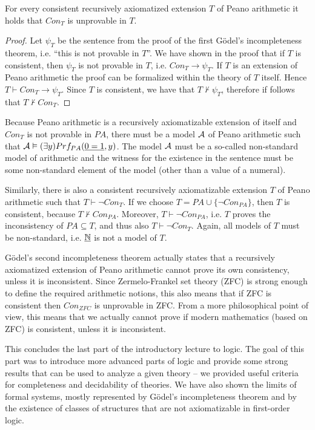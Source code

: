 \begin{theorem}
For every consistent recursively axiomatized extension $T$ of Peano arithmetic it holds that $Con_T$ is unprovable in $T$.
\end{theorem}
\begin{proof}
Let $\psi_T$ be the sentence from the proof of the first Gödel's incompleteness theorem, i.e. ``this is not provable in $T$''. We have shown in the proof that if $T$ is consistent, then $\psi_T$ is not provable in $T$, i.e. $Con_T \to \psi_T$. If $T$ is an extension of Peano arithmetic the proof can be formalized within the theory of $T$ itself. Hence $T\vdash Con_T \to \psi_T$. Since $T$ is consistent, we have that $T\nvdash \psi_T$, therefore if follows that $T \nvdash Con_T$. 
\end{proof}

Because Peano arithmetic is a recursively axiomatizable extension of itself and $Con_T$ is not provable in $PA$, there must be a model $\mathcal{A}$ of Peano arithmetic such that $\mathcal{A} \vDash (\exists y)Prf_{PA}(\underline{0 = 1}, y)$. The model $\mathcal{A}$ must be a so-called non-standard model of arithmetic and the witness for the existence in the sentence must be some non-standard element of the model (other than a value of a numeral).

Similarly, there is also a consistent recursively axiomatizable extension $T$ of Peano arithmetic such that $T \vdash \neg Con_T$. If we choose $T = PA \cup \{\neg Con_{PA}\}$, then $T$ is consistent, because $T \nvdash Con_{PA}$. Moreover, $T \vdash \neg Con_{PA}$, i.e. $T$ proves the inconsistency of $PA \subseteq T$, and thus also $T \vdash \neg Con_T$. Again, all models of $T$ must be non-standard, i.e. $\underline{\mathbb{N}}$ is not a model of $T$.

Gödel's second incompleteness theorem actually states that a recursively axiomatized extension of Peano arithmetic cannot prove its own consistency, unless it is inconsistent. Since Zermelo-Frankel set theory (ZFC) is strong enough to define the required arithmetic notions, this also means that if ZFC is consistent then $Con_{ZFC}$ is unprovable in ZFC. From a more philosophical point of view, this means that we actually cannot prove if modern mathematics (based on ZFC) is consistent, unless it is inconsistent.

\bigskip

This concludes the last part of the introductory lecture to logic. The goal of this part was to introduce more advanced parts of logic and provide some strong results that can be used to analyze a given theory -- we provided useful criteria for completeness and decidability of theories. We have also shown the limits of formal systems, mostly represented by Gödel's incompleteness theorem and by the existence of classes of structures that are not axiomatizable in first-order logic. 
